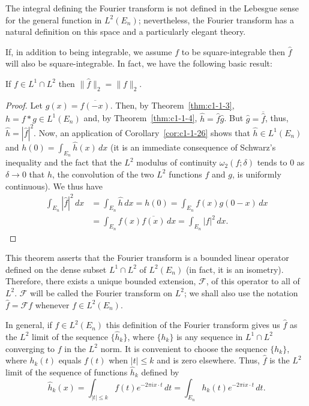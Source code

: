 The integral defining the Fourier transform is not defined in the Lebesgue
sense for the general function in $L^{2}(E_{n})$; nevertheless, the Fourier
transform has a natural definition on this space and a particularly elegant
theory.

If, in addition to being integrable, we assume $f$ to be square-integrable
then $\hat{f}$ will also be square-integrable. In fact, we have the following
basic result:

\begin{theorem}\label{thm:c1-2-1}
If $f \in L^{1} \cap L^{2}$ then $\|\hat{f}\|_{2} = \|f\|_{2}$.
\end{theorem}

\begin{proof}
Let $g(x) = \overline{f(-x)}$. Then, by Theorem~\ref{thm:c1-1-3},
$h = f * g \in L^{1}(E_{n})$ and, by Theorem~\ref{thm:c1-1-4},
$\hat{h} = \hat{f}\hat{g}$. But $\hat{g} = \overline{\hat{f}}$, thus,
$\hat{h} = |\hat{f}|^{2}$. Now, an application of
Corollary~\ref{cor:c1-1-26} shows that $\hat{h} \in L^{1}(E_{n})$ and
$h(0) = \int_{E_{n}} \hat{h}(x) \, dx$ (it is an immediate consequence of
Schwarz's inequality and the fact that the $L^{2}$ modulus of continuity
$\omega_{2}(f; \delta)$ tends to $0$ as $\delta \to 0$ that $h$, the
convolution of the two $L^{2}$ functions $f$ and $g$, is uniformly
continuous). We thus have
\begin{align*}
\int_{E_{n}}|\hat{f}|^{2}\,dx
&=\int_{E_{n}}\hat{h}\,dx=h(0)=\int_{E_{n}}f(x)g(0-x)\,dx\\
&=\int_{E_{n}}f(x)\overline{f(x)}\,dx=\int_{E_{n}}|f|^{2}\,dx.
\end{align*}
\end{proof}

This theorem asserts that the Fourier transform is a bounded linear operator
defined on the dense subset $L^{1} \cap L^{2}$ of $L^{2}(E_{n})$ (in fact, it
is an isometry). Therefore, there exists a unique bounded extension,
$\mathcal{F}$, of this operator to all of $L^{2}$. $\mathcal{F}$ will be
called the Fourier transform on $L^{2}$; we shall also use the notation
$\hat{f} = \mathcal{F}f$ whenever $f \in L^{2}(E_{n})$.

In general, if $f \in L^{2}(E_{n})$ this definition of the Fourier transform
gives us $\hat{f}$ as the $L^{2}$ limit of the sequence $\{\hat{h}_{k}\}$,
where $\{h_{k}\}$ is any sequence in $L^{1} \cap L^{2}$ converging to $f$ in
the $L^{2}$ norm. It is convenient to choose the sequence $\{h_{k}\}$, where
$h_{k}(t)$ equals $f(t)$ when $|t| \leq k$ and is zero elsewhere. Thus,
$\hat{f}$ is the $L^{2}$ limit of the sequence of functions $\hat{h}_{k}$
defined by
\begin{equation}\label{eq:c1-2-2}
\hat{h}_{k}(x)=\int_{|t|\leq k}f(t)e^{-2\pi i x\cdot t}\,dt
=\int_{E_{n}}h_{k}(t)e^{-2\pi i x\cdot t}\,dt.
\end{equation}

